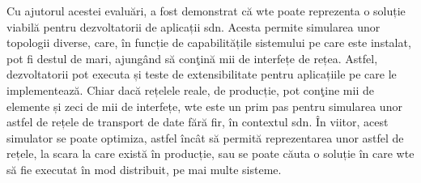Cu ajutorul acestei evaluări, a fost demonstrat că \gls{wte} poate reprezenta o soluție viabilă pentru dezvoltatorii de aplicații \gls{sdn}. Acesta permite simularea unor topologii diverse, care, în funcție de capabilitățile sistemului pe care este instalat, pot fi destul de mari, ajungând să conţină mii de interfețe de rețea. Astfel, dezvoltatorii pot executa și teste de extensibilitate pentru aplicațiile pe care le implementează. Chiar dacă rețelele reale, de producție, pot conţine mii de elemente și zeci de mii de interfețe, \gls{wte} este un prim pas pentru simularea unor astfel de rețele de transport de date fără fir, în contextul \gls{sdn}. În viitor, acest simulator se poate optimiza, astfel încât să permită reprezentarea unor astfel de rețele, la scara la care există în producție, sau se poate căuta o soluție în care \gls{wte} să fie executat în mod distribuit, pe mai multe sisteme.